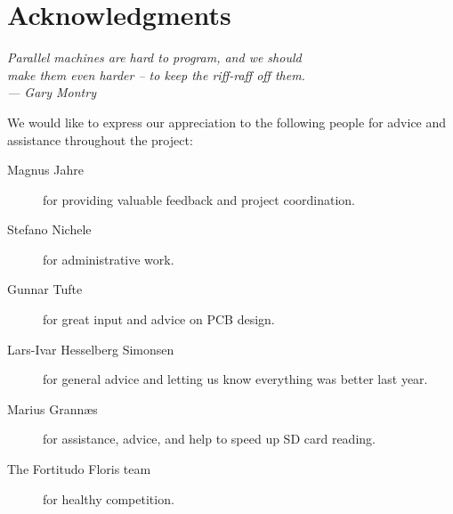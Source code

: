 
\bigskip

\begingroup
\let\clearpage\relax
\let\cleardoublepage\relax
\let\cleardoublepage\relax
\chapter*{Acknowledgments}
\begin{flushright}{\slshape
    Parallel machines are hard to program, and we should\\
    make them even harder -- to keep the riff-raff off them.\\ \medskip
    ---  Gary Montry}  %
\end{flushright}
\bigskip

We would like to express our appreciation to the following people for
advice and assistance throughout the project:

\begin{description} %
\item[Magnus Jahre] for providing valuable feedback and project coordination.
\item[Stefano Nichele] for administrative work.
\item[Gunnar Tufte] for great input and advice on PCB design.
\item[Lars-Ivar Hesselberg Simonsen] for general advice and letting us know
  everything was better last year.
\item[Marius Grann{\ae}s] for assistance, advice, and help to speed up SD
  card reading.
\item[The Fortitudo Floris team] for healthy competition.
\end{description}
\endgroup
